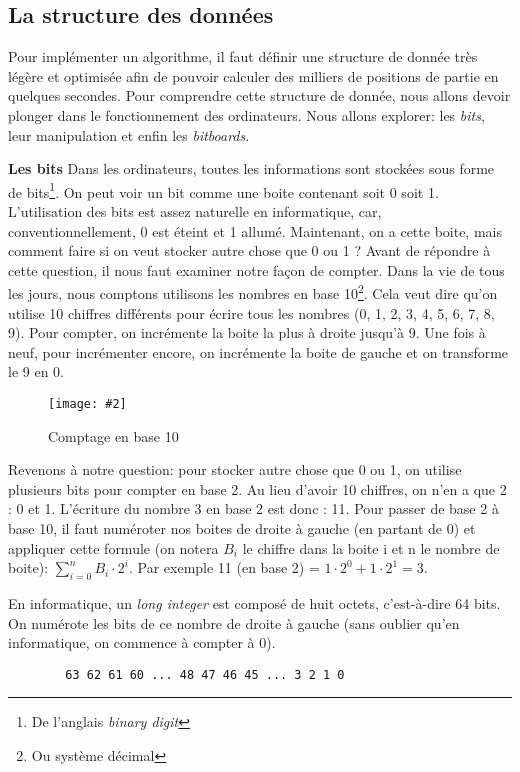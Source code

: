 \documentclass[a4paper]{article}
\newcommand{\img}[3][]{
    \begin{figure}[H]
        \centering
        \texttt{[image: \#2]}
        \caption{#1}    
    \end{figure}
}
\newcommand{\ptitle}[1]{\vspace{10pt}
{\large \noindent \textbf{#1}}}
\begin{document}
\subsection{La structure des données}
    Pour implémenter un algorithme, il faut définir une structure de donnée très légère et optimisée afin de pouvoir calculer des milliers de positions de partie en quelques secondes. Pour comprendre cette structure de donnée, nous allons devoir plonger dans le fonctionnement des ordinateurs. Nous allons explorer: les \textit{bits}, leur manipulation et enfin les \textit{bitboards}.
    
    \ptitle{Les bits}
    Dans les ordinateurs, toutes les informations sont stockées sous forme de bits\footnote{De l'anglais \textit{binary digit}}. On peut voir un bit comme une boite contenant soit 0 soit 1. L'utilisation des bits est assez naturelle en informatique, car, conventionnellement, 0 est éteint et 1 allumé. Maintenant, on a cette boite, mais comment faire si on veut stocker autre chose que 0 ou 1 ? Avant de répondre à cette question, il nous faut examiner notre façon de compter. Dans la vie de tous les jours, nous comptons utilisons les nombres en base 10\footnote{Ou système décimal}. Cela veut dire qu'on utilise 10 chiffres différents pour écrire tous les nombres (0, 1, 2, 3, 4, 5, 6, 7, 8, 9). Pour compter, on incrémente la boite la plus à droite jusqu'à 9. Une fois à neuf, pour incrémenter encore, on incrémente la boite de gauche et on transforme le 9 en 0.
    
    \img[Comptage en base 10]{Images/ComptageDecimal.PNG}{0.5}

    Revenons à notre question: pour stocker autre chose que 0 ou 1, on utilise plusieurs bits pour compter en base 2. Au lieu d'avoir 10 chiffres, on n'en a que 2 : 0 et 1. L'écriture du nombre 3 en base 2 est donc : 11. Pour passer de base 2 à base 10, il faut numéroter nos boites de droite à gauche (en partant de 0) et appliquer cette formule (on notera $B_i$ le chiffre dans la boite i et n le nombre de boite): $\sum_{i=0}^{n} B_i\cdot2^{i}$. Par exemple 11 (en base 2) = $1\cdot2^{0}+1\cdot2^{1} = 3$.
     
    En informatique, un \textit{long integer} est composé de huit octets, c'est-à-dire 64 bits. On numérote les bits de ce nombre de droite à gauche (sans oublier qu'en informatique, on commence à compter à 0).

    \begin{lstlisting}
        63 62 61 60 ... 48 47 46 45 ... 3 2 1 0
    \end{lstlisting}
    
\end{document}
